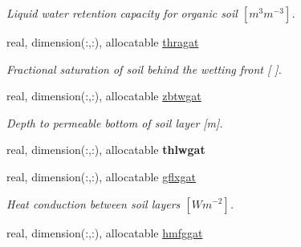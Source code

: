 \begin{DoxyCompactItemize}
\begin{DoxyCompactList}\small\item\em Liquid water retention capacity for organic soil $[m^3 m^{-3} ]$. \end{DoxyCompactList}\item 
\hypertarget{structclass__statevars_1_1class__gather_a546488daa03e3703e14f356e56f225e0}{}real, dimension(\+:,\+:), allocatable \hyperlink{structclass__statevars_1_1class__gather_a546488daa03e3703e14f356e56f225e0}{thragat}\label{structclass__statevars_1_1class__gather_a546488daa03e3703e14f356e56f225e0}

\begin{DoxyCompactList}\small\item\em Fractional saturation of soil behind the wetting front \mbox{[} \mbox{]}. \end{DoxyCompactList}\item 
\hypertarget{structclass__statevars_1_1class__gather_a06b2f5fd86dcac60673b4092347e550d}{}real, dimension(\+:,\+:), allocatable \hyperlink{structclass__statevars_1_1class__gather_a06b2f5fd86dcac60673b4092347e550d}{zbtwgat}\label{structclass__statevars_1_1class__gather_a06b2f5fd86dcac60673b4092347e550d}

\begin{DoxyCompactList}\small\item\em Depth to permeable bottom of soil layer \mbox{[}m\mbox{]}. \end{DoxyCompactList}\item 
\hypertarget{structclass__statevars_1_1class__gather_a44984bc09531baf6f55d0890b497f22d}{}real, dimension(\+:,\+:), allocatable {\bfseries thlwgat}\label{structclass__statevars_1_1class__gather_a44984bc09531baf6f55d0890b497f22d}

\item 
\hypertarget{structclass__statevars_1_1class__gather_a0a543e570316834950071fb77b8eb983}{}real, dimension(\+:,\+:), allocatable \hyperlink{structclass__statevars_1_1class__gather_a0a543e570316834950071fb77b8eb983}{gflxgat}\label{structclass__statevars_1_1class__gather_a0a543e570316834950071fb77b8eb983}

\begin{DoxyCompactList}\small\item\em Heat conduction between soil layers $[W m^{-2} ]$. \end{DoxyCompactList}\item 
\hypertarget{structclass__statevars_1_1class__gather_afa67f10782ae05590d0efdd75cb411be}{}real, dimension(\+:,\+:), allocatable \hyperlink{structclass__statevars_1_1class__gather_afa67f10782ae05590d0efdd75cb411be}{hmfggat}\label{structclass__statevars_1_1class__gather_afa67f10782ae05590d0efdd75cb411be}


\end{DoxyCompactItemize}
